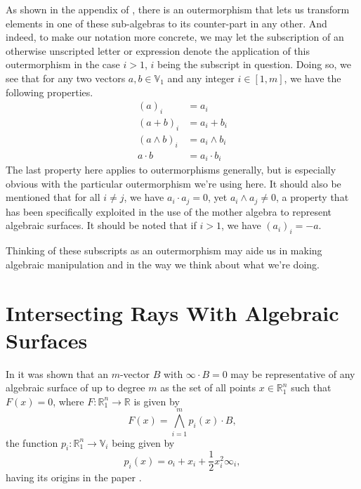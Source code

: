 \documentclass{birkjour}
\theoremstyle{definition}
\theoremstyle{remark}
\numberwithin{equation}{section}
\newcommand{\R}{\mathbb{R}}
\newcommand{\V}{\mathbb{V}}
\newcommand{\nvai}{\infty}
\newcommand{\nvao}{o}
\begin{document}
As shown in the appendix of \cite{}, there is an outermorphism that lets us transform
elements in one of these sub-algebras to its counter-part in any other.  And indeed,
to make our notation more concrete, we may let the subscription of an
otherwise unscripted letter or expression denote the application of this outermorphism
in the case $i>1$, $i$ being the subscript in question.
Doing so, we see that for any two vectors $a,b\in\V_1$ and any integer $i\in[1,m]$, we have
the following properties.
\begin{align*}
(a)_i &= a_i \\
(a+b)_i &= a_i + b_i \\
(a\wedge b)_i &= a_i\wedge b_i \\
a\cdot b &= a_i\cdot b_i
\end{align*}
The last property here applies to outermorphisms generally, but is especially obvious
with the particular outermorphism we're using here.
It should also be mentioned that for all $i\neq j$, we have $a_i\cdot a_j=0$, yet $a_i\wedge a_j\neq 0$,
a property that has been specifically exploited in the use of the mother algebra to
represent algebraic surfaces.
It should be noted that if $i>1$, we have $(a_i)_i=-a$.

Thinking of these subscripts as an outermorphism may aide us in making algebraic manipulation
and in the way we think about what we're doing.

\section{Intersecting Rays With Algebraic Surfaces}

In \cite{} it was shown that an $m$-vector $B$ with $\nvai\cdot B=0$ may be representative of any
algebraic surface of up to degree $m$ as the set of all points $x\in\R_1^n$ such that $F(x)=0$,
where $F:\R_1^n\to\R$ is given by
\begin{equation*}
F(x) = \bigwedge_{i=1}^m p_i(x)\cdot B,
\end{equation*}
the function $p_i:\R_1^n\to\V_i$ being given by
\begin{equation*}
p_i(x) = \nvao_i + x_i + \frac{1}{2}x_i^2\nvai_i,
\end{equation*}
having its origins in the paper \cite{}.
\end{document}
